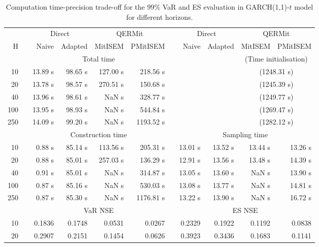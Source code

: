 \footnotesize{  
{ \renewcommand{\arraystretch}{1.3} 
\begin{longtable}{rr rrrr r rrrr}  
\caption{Computation time-precision trade-off for the  $99\%$ VaR and ES evaluation in GARCH(1,1)-$t$ model for different horizons.} 
\label{tab:time_precision_t_garch2_noS} \\ 
 & & \multicolumn{2}{c}{Direct} & \multicolumn{2}{c}{QERMit}&  & \multicolumn{2}{c}{Direct} & \multicolumn{2}{c}{QERMit} \\ \cline{3-6} \cline{8-11} 
 H & & Naive & Adapted & MitISEM & PMitISEM & & Naive & Adapted & MitISEM & PMitISEM \\ \hline 
 & & \multicolumn{4}{c}{Total time} & & && \multicolumn{2}{c}{(Time initialisation)} \\ \cline{3-6} \cline{10-11}
10 & & 13.89 s & 98.65 s & 127.00 s & 218.56 s &&&& \multicolumn{2}{c}{(1248.31 s)} \\ 
20 & & 13.78 s & 98.57 s & 270.51 s & 150.68 s &&&& \multicolumn{2}{c}{(1245.39 s)} \\ 
40 & & 13.96 s & 98.61 s &  NaN s & 328.77 s &&&& \multicolumn{2}{c}{(1249.77 s)} \\ 
100 & & 13.95 s & 98.93 s &  NaN s & 544.84 s &&&& \multicolumn{2}{c}{(1269.47 s)} \\ 
250 & & 14.09 s & 99.20 s &  NaN s & 1193.52 s &&&& \multicolumn{2}{c}{(1282.12 s)} \\ 
\hline 
 & & \multicolumn{4}{c}{Construction time} & & \multicolumn{4}{c}{ Sampling time} \\ \cline{3-6}  \cline{8-11}
10 & & 0.88 s & 85.14 s & 113.56 s & 205.31 s && 13.01 s & 13.52 s & 13.44 s & 13.26 s \\ 
20 & & 0.88 s & 85.01 s & 257.03 s & 136.29 s && 12.91 s & 13.56 s & 13.48 s & 14.39 s \\ 
40 & & 0.91 s & 85.01 s &  NaN s & 314.87 s && 13.05 s & 13.60 s &  NaN s & 13.90 s \\ 
100 & & 0.87 s & 85.16 s &  NaN s & 530.03 s && 13.08 s & 13.77 s &  NaN s & 14.81 s \\ 
250 & & 0.87 s & 85.30 s &  NaN s & 1176.81 s && 13.22 s & 13.90 s &  NaN s & 16.72 s \\ 
\hline 
 & & \multicolumn{4}{c}{VaR NSE} &&  \multicolumn{4}{c}{ES NSE} \\ \cline{3-6}  \cline{8-11}
10 && 0.1836  & 0.1748  & 0.0531 & 0.0267 && 0.2329  & 0.1922  & 0.1192 & 0.0838 \\ 
20 && 0.2907  & 0.2151  & 0.1454 & 0.0626 && 0.3923  & 0.3436  & 0.1683 & 0.1141 \\ 

\end{longtable}}}
